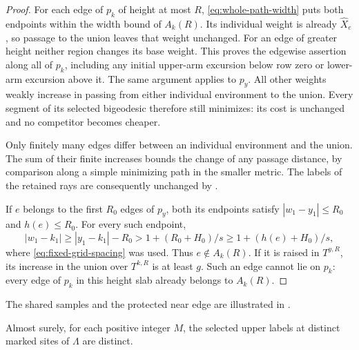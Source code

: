 \begin{proof}
For each edge of $p_k$ of height at most $R$,
\eqref{eq:whole-path-width} puts both endpoints within the width bound
of $A_k(R)$.  Its individual weight is already $\widehat X_e$, so passage
to the union leaves that weight unchanged.  For an edge of greater
height neither region changes its base weight.  This proves the
edgewise assertion along all of $p_k$, including any initial upper-arm
excursion below row zero or lower-arm excursion above it.  The same
argument applies to $p_y$.  All other weights weakly increase in passing
from either individual environment to the union.  Every segment of its
selected bigeodesic therefore still minimizes: its cost is unchanged
and no competitor becomes cheaper.

Only finitely many edges differ between an individual environment and
the union.  The sum of their finite increases bounds the change of any
passage distance, by comparison along a simple minimizing path in the
smaller metric.  The labels of the retained rays are consequently
unchanged by .

If $e$ belongs to the first $R_0$ edges of $p_y$, both its endpoints
satisfy $|w_1-y_1|\leq R_0$ and $h(e)\leq R_0$.  For every such endpoint,
\[
 |w_1-k_1|\geq |y_1-k_1|-R_0
 >1+(R_0+H_0)/s\geq1+(h(e)+H_0)/s,
\]
where \eqref{eq:fixed-grid-spacing} was used.  Thus $e\notin A_k(R)$.
If it is raised in $T^{y,R}$, its increase in the union over $T^{k,R}$
is at least $g$.  Such an edge cannot lie on $p_k$: every edge of $p_k$
in this height slab already belongs to $A_k(R)$.
\end{proof}

The shared samples and the protected near edge are illustrated in
.

\newpage

\begin{proposition}\label{prop:distinct-marks}
Almost surely, for each positive integer $M$, the selected upper labels
at distinct marked sites of $\Lambda$ are distinct.
\end{proposition}

